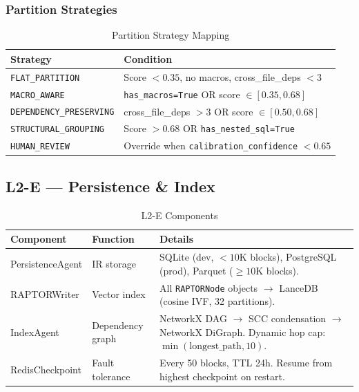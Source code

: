 \documentclass[11pt,a4paper]{article}
\begin{document}
\subsubsection{Partition Strategies}

\begin{table}[H]
\centering
\caption{Partition Strategy Mapping}
\renewcommand{\arraystretch}{1.25}
\small
\begin{tabularx}{\textwidth}{@{} l X @{}}
\toprule
\textbf{Strategy} & \textbf{Condition} \\
\midrule
\texttt{FLAT\_PARTITION} & Score $< 0.35$, no macros, cross\_file\_deps $< 3$ \\
\texttt{MACRO\_AWARE} & \texttt{has\_macros=True} OR score $\in [0.35, 0.68]$ \\
\texttt{DEPENDENCY\_PRESERVING} & cross\_file\_deps $> 3$ OR score $\in [0.50, 0.68]$ \\
\texttt{STRUCTURAL\_GROUPING} & Score $> 0.68$ OR \texttt{has\_nested\_sql=True} \\
\texttt{HUMAN\_REVIEW} & Override when \texttt{calibration\_confidence} $< 0.65$ \\
\bottomrule
\end{tabularx}
\end{table}

\subsection{L2-E — Persistence \& Index}

\begin{table}[H]
\centering
\caption{L2-E Components}
\renewcommand{\arraystretch}{1.3}
\small
\begin{tabularx}{\textwidth}{@{} l L{2.8cm} X @{}}
\toprule
\textbf{Component} & \textbf{Function} & \textbf{Details} \\
\midrule
PersistenceAgent & IR storage & SQLite (dev, $<10$K blocks), PostgreSQL (prod), Parquet ($\geq 10$K blocks). \\
RAPTORWriter & Vector index & All \texttt{RAPTORNode} objects $\to$ LanceDB (cosine IVF, 32 partitions). \\
IndexAgent & Dependency graph & NetworkX DAG $\to$ SCC condensation $\to$ NetworkX DiGraph. Dynamic hop cap: $\min(\text{longest\_path}, 10)$. \\
RedisCheckpoint & Fault tolerance & Every 50 blocks, TTL 24h. Resume from highest checkpoint on restart. \\
\bottomrule
\end{tabularx}
\end{table}
\end{document}
